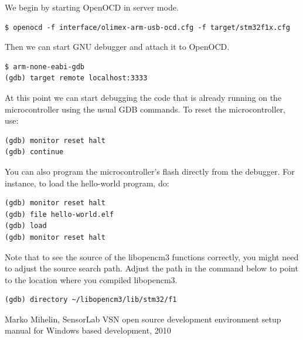 \documentclass[a4paper, 10pt]{article}
\begin{document}
We begin by starting OpenOCD in server mode.

\begin{verbatim}
$ openocd -f interface/olimex-arm-usb-ocd.cfg -f target/stm32f1x.cfg
\end{verbatim}

Then we can start GNU debugger and attach it to OpenOCD.

\begin{verbatim}
$ arm-none-eabi-gdb
(gdb) target remote localhost:3333
\end{verbatim}

At this point we can start debugging the code that is already running on the
microcontroller using the usual GDB commands. To reset the microcontroller, use:

\begin{verbatim}
(gdb) monitor reset halt
(gdb) continue
\end{verbatim}

You can also program the microcontroller's flash directly from the debugger. For
instance, to load the hello-world program, do:

\begin{verbatim}
(gdb) monitor reset halt
(gdb) file hello-world.elf
(gdb) load
(gdb) monitor reset halt
\end{verbatim}

Note that to see the source of the libopencm3 functions correctly, you might
need to adjust the source search path. Adjust the path in the command below to
point to the location where you compiled libopencm3.

\begin{verbatim}
(gdb) directory ~/libopencm3/lib/stm32/f1
\end{verbatim}

\newpage

\begin{thebibliography}{9}
   Marko Mihelin, SensorLab VSN open source development environment setup manual for Windows based development,
   2010

\end{thebibliography}
\end{document}
